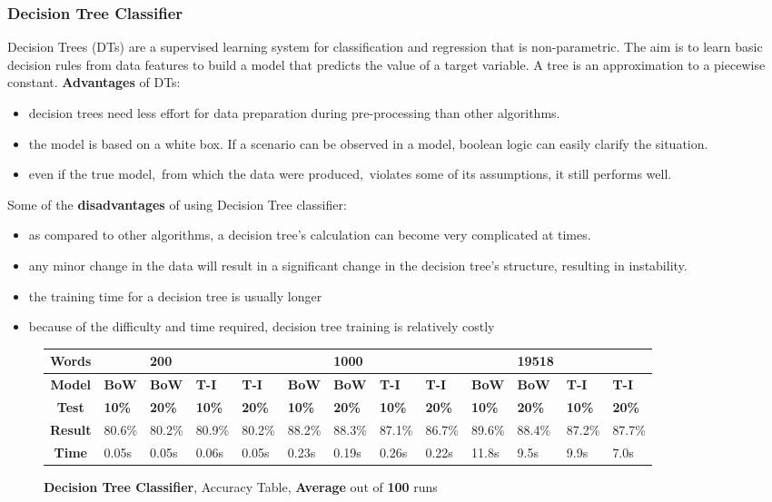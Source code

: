 \documentclass{article}
\begin{document}
	\subsubsection{Decision Tree Classifier}
	Decision Trees (DTs) are a supervised learning system for classification and regression that is non-parametric. The aim is to learn basic decision rules from data features to build a model that predicts the value of a target variable. A tree is an approximation to a piecewise constant.
	\textbf{Advantages} of DTs:
\begin{itemize}
\item decision trees need less effort for data preparation during pre-processing than other algorithms.
\item the model is based on a white box. If a scenario can be observed in a model, boolean logic can easily clarify the situation.
\item even if the true model, from which the data were produced, violates some of its assumptions, it still performs well.
\end{itemize}
Some of the \textbf{disadvantages} of using Decision Tree classifier:
\begin{itemize}
\item as compared to other algorithms, a decision tree's calculation can become very complicated at times.
\item any minor change in the data will result in a significant change in the decision tree's structure, resulting in instability.
\item the training time for a decision tree is usually longer
\item because of the difficulty and time required, decision tree training is relatively costly
\end{itemize}
	\begin{figure}[H]
		\begin{tabular}{||c||l|l|l|l||l|l|l|l||l|l|l|l||}
			\hline
			\textbf{Words} &  & \textbf{200} & & & &\textbf{1000} & & & & \textbf{19518} &  & \\ \hline 
			\textbf{Model} & \textbf{BoW} & \textbf{BoW} & \textbf{T-I} & \textbf{T-I} &\textbf{BoW} & \textbf{BoW} & \textbf{T-I} & \textbf{T-I} & \textbf{BoW} & \textbf{BoW} & \textbf{T-I} & \textbf{T-I}\\ \hline
			\textbf{Test} & \textbf{10\%} & \textbf{20\%} & \textbf{10\%} & \textbf{20\%} & \textbf{10\%} & \textbf{20\%} & \textbf{10\%} & \textbf{20\%} & \textbf{10\%} & \textbf{20\%} & \textbf{10\%} & \textbf{20\%} \\ \hline \hline  
			\textbf{Result} & 80.6\% & 80.2\% & 80.9\% & 80.2\% & 88.2\% & 88.3\% & 87.1\% & 86.7\% & 89.6\% & 88.4\% & 87.2\% & 87.7\% \\ \hline 
			\textbf{Time} & 0.05s & 0.05s & 0.06s & 0.05s & 0.23s & 0.19s & 0.26s & 0.22s & 11.8s & 9.5s & 9.9s & 7.0s \\ \hline 
		\end{tabular}
		\caption{\textbf{Decision Tree Classifier}, Accuracy Table, \textbf{Average} out of \textbf{100} runs}
	\end{figure}
	
\end{document}

